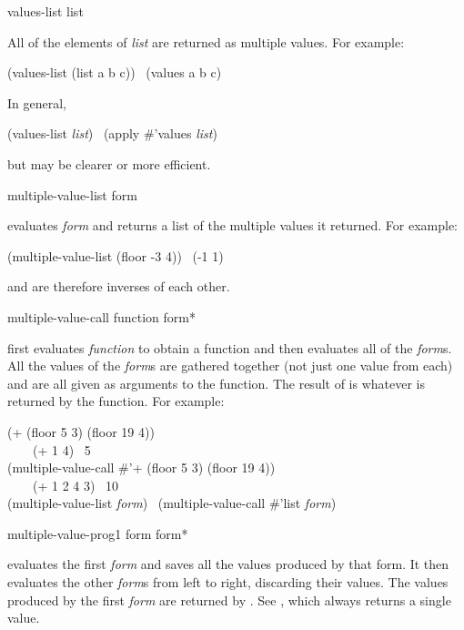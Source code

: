 \begin{defun}[Function]
values-list list

All of the elements of \emph{list} are returned as multiple values.
For example:
\begin{lisp}
(values-list (list a b c)) \EQ\ (values a b c)
\end{lisp}
In general,
\begin{lisp}
(values-list \emph{list}) \EQ\ (apply \#'values \emph{list})
\end{lisp}
but  may be clearer or more efficient.
\end{defun}

\begin{defmac}
multiple-value-list form

 evaluates \emph{form} and returns a list of
the multiple values it returned.
For example:
\begin{lisp}
(multiple-value-list (floor -3 4)) \EV\ (-1 1)
\end{lisp}
 and  are therefore inverses
of each other.
\end{defmac}

\begin{defspec}
multiple-value-call function {form}*

 first evaluates \emph{function} to obtain a function
and then evaluates all of the \emph{form\/}s.  All the values
of the \emph{form\/}s are gathered together (not just one value from each)
and are all given as arguments to the function.  The result of 
is whatever is returned by the function.
For example:
\begin{lisp}
(+ (floor 5 3) (floor 19 4)) \\
~~~\EQ\ (+ 1 4) \EV\ 5 \\
(multiple-value-call \#'+ (floor 5 3) (floor 19 4)) \\
~~~\EQ\ (+ 1 2 4 3) \EV\ 10 \\
(multiple-value-list \emph{form}) \EQ\ (multiple-value-call \#'list \emph{form})
\end{lisp}
\end{defspec}

\begin{defspec}
multiple-value-prog1 form {form}*

 evaluates the first \emph{form} and saves all the values
produced by that form.  It then evaluates the other \emph{form}s
from left to right, discarding their values.  The values produced
by the first \emph{form} are returned by .  See ,
which always returns a single value.
\end{defspec}

